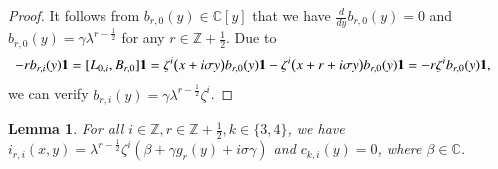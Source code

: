 \documentclass[12pt,reqno]{amsart}
\def\Z{\mathbb{Z}}
\def\C{\mathbb{C}}
\numberwithin{equation}{section}
\newtheorem{lemm}[theo]{Lemma}
\begin{document}
\begin{proof}
 It follows from  $b_{r,0}(y)\in\mathbb{C}[y]$ that we have $\frac{d}{dy}b_{r,0}(y)=0$  and
 $b_{r,0}(y)=\gamma\lambda^{r-\frac{1}{2}}$ for any $r\in\Z+\frac{1}{2}$. 
 Due to
\begin{equation*}
\aligned
-rb_{r,i}(y)\mathbf{1}
&=[L_{0,i},B_{r,0}]\mathbf{1}=\zeta^i
\bigl(x+i\sigma y\bigr)b_{r,0}(y)\mathbf{1}
-\zeta^i
\bigl(x+r+i\sigma y\bigr)b_{r,0}(y)\mathbf{1}=-r\zeta^ib_{r,0}(y)\mathbf{1},
\endaligned
\end{equation*}
we can verify $b_{r,i}(y)=\gamma\lambda^{r-\frac{1}{2}}\zeta^i$.
\end{proof}




\begin{lemm}\label{le4.7}
For all $i\in\Z, r\in\mathbb{Z}+\frac{1}{2},k\in\{3,4\}$, we have $i_{r,i}(x,y)=\lambda^{r-\frac{1}{2}}\zeta^i(\beta+\gamma g_r(y)+i\sigma \gamma)$ and $c_{k,i}(y)=0$, where $\beta\in\C$. 
\end{lemm}
\end{document}
